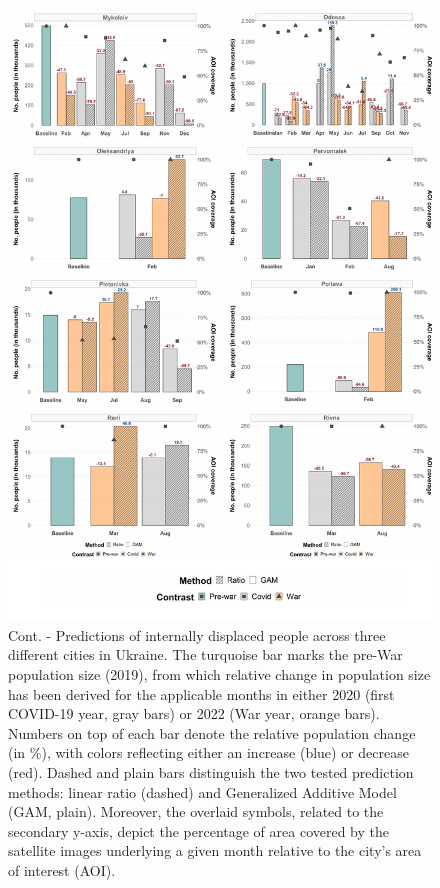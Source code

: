 \documentclass[sn-basic]{sn-jnl}%
\begin{document}
{\begin{appendices}
\begin{figure}[h!]
\begin{center}
\includegraphics[scale = 0.6]{Figures/SM_IDP_pred_Fig4.pdf}
\end{center}
\caption{Cont. - Predictions of internally displaced people across three different cities in Ukraine. The turquoise bar marks the pre-War population size (2019), from which relative change in population size has been derived for the applicable months in either 2020 (first COVID-19 year, gray bars) or 2022 (War year, orange bars). Numbers on top of each bar denote the relative population change (in \%), with colors reflecting either an increase (blue) or decrease (red). Dashed and plain bars distinguish the two tested prediction methods: linear ratio (dashed) and Generalized Additive Model (GAM, plain). Moreover, the overlaid symbols, related to the secondary y-axis, depict the percentage of area covered by the satellite images underlying a given month relative to the city's area of interest (AOI).}
\label{figSM_IDP_pred_Fig4}
\end{figure}



\end{appendices}}
\end{document}
